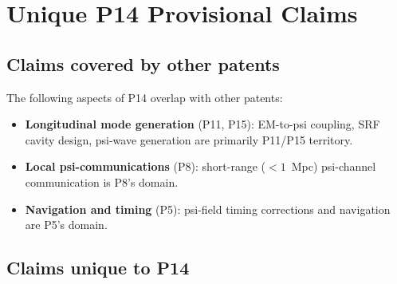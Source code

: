 \documentclass[11pt]{article}
\begin{document}
\section{Unique P14 Provisional Claims}
\label{sec:provisional-claims}

\subsection{Claims covered by other patents}

The following aspects of P14 overlap with other patents:
\begin{itemize}
\item \textbf{Longitudinal mode generation} (P11, P15): EM-to-psi coupling,
  SRF cavity design, psi-wave generation are primarily P11/P15 territory.
\item \textbf{Local psi-communications} (P8): short-range ($< 1$~Mpc) psi-channel
  communication is P8's domain.
\item \textbf{Navigation and timing} (P5): psi-field timing corrections and
  navigation are P5's domain.
\end{itemize}

\subsection{Claims unique to P14}
\end{document}
